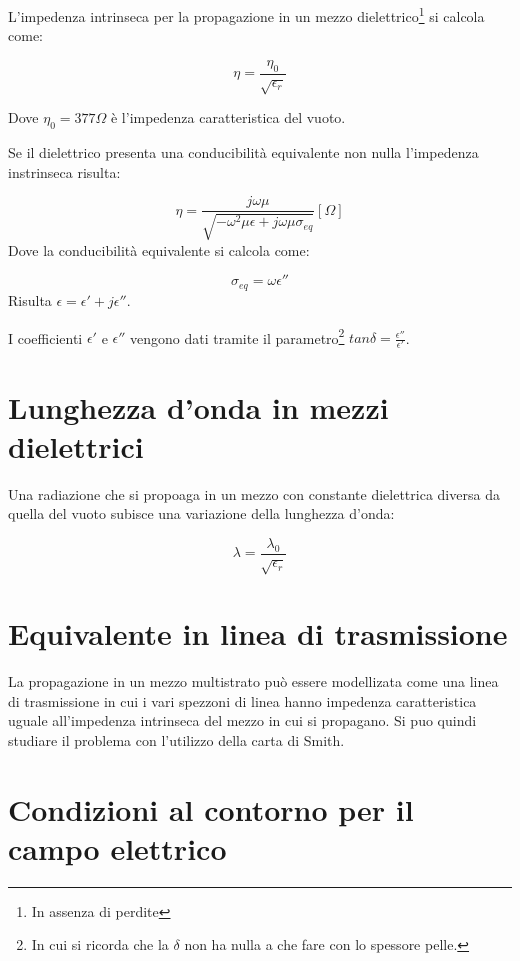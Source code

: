 \documentclass[10pt,a4paper]{report}
\begin{document}
		L'impedenza intrinseca per la propagazione in un mezzo dielettrico\footnote{In assenza di perdite} si calcola come:

		\begin{equation}
		\eta=\frac{\eta_0}{\sqrt{\epsilon_r}}
		\end{equation}

		Dove $\eta_0=377\Omega$ è l'impedenza caratteristica del vuoto.

		Se il dielettrico presenta una conducibilità equivalente non nulla l'impedenza instrinseca risulta:

		\begin{equation}
		\eta=\frac{j\omega\mu}{\sqrt{-\omega^2\mu\epsilon+j\omega\mu\sigma_{eq}}} [  \Omega  ]
		\end{equation}
		Dove la conducibilità equivalente si calcola come:

		\begin{equation}
		\sigma_{eq}=\omega \epsilon''
		\end{equation}
		Risulta $\epsilon=\epsilon'+j\epsilon''$.
		
		I coefficienti $\epsilon'$ e $\epsilon''$ vengono dati tramite il parametro\footnote{In cui si ricorda che la $\delta$ non ha nulla a che fare con lo spessore pelle.} $tan\delta=\frac{\epsilon''}{\epsilon'}$.

	\section{Lunghezza d'onda in mezzi dielettrici}
		Una radiazione che si propoaga in un mezzo con constante dielettrica diversa da quella del vuoto subisce una variazione della lunghezza d'onda:

		\begin{equation} 
		\lambda = \frac {\lambda_0} {\sqrt {\epsilon_r} }
		\end{equation} 

	\section{Equivalente in linea di trasmissione}

		
		La propagazione in un mezzo multistrato può essere modellizata come una linea di trasmissione in cui i vari spezzoni di linea hanno impedenza caratteristica uguale all'impedenza intrinseca del mezzo in cui si propagano.	
		Si puo quindi studiare il problema con l'utilizzo della carta di Smith.

	\section{Condizioni al contorno per il campo elettrico}
\end{document}
